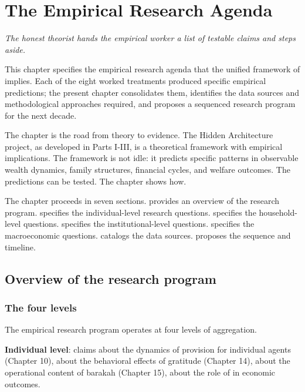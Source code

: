 \chapter{The Empirical Research Agenda}
\label{ch:research-agenda}

\epigraph{\itshape The honest theorist hands the empirical worker a
list of testable claims and steps aside.}{}

\noindent
This chapter specifies the empirical research agenda that the
unified framework of  implies. Each of the eight
worked treatments produced specific empirical predictions; the
present chapter consolidates them, identifies the data sources
and methodological approaches required, and proposes a
sequenced research program for the next decade.

The chapter is the road from theory to evidence. The Hidden
Architecture project, as developed in Parts I-III, is a
theoretical framework with empirical implications. The framework
is not idle: it predicts specific patterns in observable wealth
dynamics, family structures, financial cycles, and welfare
outcomes. The predictions can be tested. The chapter shows how.

The chapter proceeds in seven sections. 
provides an overview of the research program. 
specifies the individual-level research questions.
 specifies the household-level questions.
 specifies the institutional-level
questions.  specifies the macroeconomic
questions.  catalogs the data sources.
 proposes the sequence and timeline.

\section{Overview of the research program}
\label{sec:agenda-overview}

\subsection{The four levels}

The empirical research program operates at four levels of
aggregation.

\textbf{Individual level}: claims about the dynamics of provision
for individual agents (Chapter 10), about the behavioral effects
of gratitude (Chapter 14), about the operational content of
barakah (Chapter 15), about the role of  in economic
outcomes.

